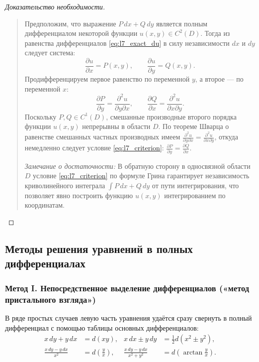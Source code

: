 \begin{proof}[Доказательство необходимости]~\\
    \begin{quote}
        Предположим, что выражение $P \, dx + Q \, dy$ является полным
        дифференциалом некоторой функции $u(x, y) \in C^2(D)$. Тогда из
        равенства дифференциалов \eqref{eq:l7_exact_du} в силу независимости
        $dx$ и $dy$ следует система:
        \[
            \frac{\partial u}{\partial x} = P(x, y), \qquad
            \frac{\partial u}{\partial y} = Q(x, y).
        \]
        Продифференцируем первое равенство по переменной $y$, а второе — по
        переменной $x$:
        \[
            \frac{\partial P}{\partial y} =
            \frac{\partial^2 u}{\partial y \partial x}, \qquad
            \frac{\partial Q}{\partial x} =
            \frac{\partial^2 u}{\partial x \partial y}.
        \]
        Поскольку $P, Q \in C^1(D)$, смешанные производные второго порядка
        функции $u(x, y)$ непрерывны в области $D$. По теореме Шварца о
        равенстве смешанных частных производных имеем
        $\frac{\partial^2 u}{\partial y \partial x} = \frac{\partial^2 u}{\partial x \partial y}$,
        откуда немедленно следует условие \eqref{eq:l7_criterion}:
        $\frac{\partial P}{\partial y} = \frac{\partial Q}{\partial x}$.

        \textit{Замечание о достаточности:} В обратную сторону в односвязной
        области $D$ условие \eqref{eq:l7_criterion} по формуле Грина гарантирует
        независимость криволинейного интеграла $\int P \, dx + Q \, dy$ от пути
        интегрирования, что позволяет явно построить функцию $u(x, y)$
        интегрированием по координатам.
    \end{quote}
\end{proof}

\subsection{Методы решения уравнений в полных дифференциалах}

\subsubsection{Метод I. Непосредственное выделение дифференциалов («метод пристального взгляда»)}

В ряде простых случаев левую часть уравнения удаётся сразу свернуть в полный
дифференциал с помощью таблицы основных дифференциалов:
\begin{align*}
    x \, dy + y \, dx &= d(x y), &
    x \, dx \pm y \, dy &= \frac{1}{2} d\left(x^2 \pm y^2\right), \\
    \frac{x \, dy - y \, dx}{x^2} &= d\left(\frac{y}{x}\right), &
    \frac{x \, dy - y \, dx}{x^2 + y^2} &= d\left(\arctan \frac{y}{x}\right).
\end{align*}

